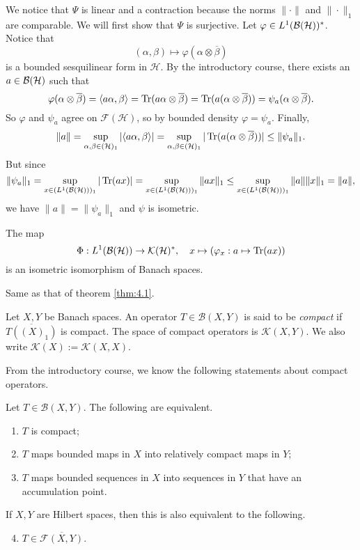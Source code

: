 \begin{myproof}
  We notice that $\Psi$ is linear and a contraction because the norms $\|\cdot \|$
  and $\| \cdot \|_1$ are comparable. We will first show that $\Psi$ is surjective.
  Let $\varphi \in L^1 (\operatorname{\mathcal{B} (\mathcal{H})})^*$. Notice that 
  $$(\alpha, \beta) \mapsto \varphi(\alpha \otimes \overline{\beta})$$
  is a bounded sesquilinear form in $\mathcal{H}$. By the introductory course, there exists 
  an $a \in \operatorname{\mathcal{B} (\mathcal{H})}$ such that 
  $$\varphi(\alpha \otimes \overline{\beta}) = \langle a \alpha, \beta \rangle = \operatorname{Tr} (a\alpha \otimes \overline{\beta}) = \operatorname{Tr} (a(\alpha \otimes \overline{\beta})) = \psi_a (\alpha \otimes \overline{\beta}).$$
  So $\varphi$ and $\psi_a$ agree on $\mathcal{F} (\mathcal{H})$, so by bounded density $\varphi = \psi_a$.
  Finally, 
  $$\| a\| = \sup_{\alpha, \beta \in (\mathcal{H})_1} |\langle a \alpha, \beta \rangle| = \sup_{\alpha, \beta \in (\mathcal{H})_1} |\operatorname{Tr} (a (\alpha \otimes \overline{\beta})) | \leq \| \psi_a \|_1.$$
  But since 
  $$\| \psi_a \|_1 = \sup_{x \in (L^1(\operatorname{\mathcal{B} (\mathcal{H})}))_1} |\operatorname{Tr} (ax)| = \sup_{x \in (L^1(\operatorname{\mathcal{B} (\mathcal{H})}))_1} \| ax \|_1 \leq \sup_{x \in (L^1(\operatorname{\mathcal{B} (\mathcal{H})}))_1} \| a \| \|x \|_1 = \| a\|,$$
  we have $\| a\| = \| \psi_a\|_1$ and $\psi$ is isometric.
\end{myproof}

\begin{corollary}
  The map $$\Phi: L^1 (\operatorname{\mathcal{B} (\mathcal{H})}) \to \mathcal{K} (\mathcal{H})^*, \quad x \mapsto (\varphi_x: a \mapsto \operatorname{Tr} (ax))$$
  is an isometric isomorphism of Banach spaces.
\end{corollary}

\begin{myproof}
  Same as that of theorem \ref{thm:4.1}.
\end{myproof}

\begin{definition}
  Let $X, Y$ be Banach spaces. An operator $T\in \mathcal{B}(X, Y)$ is said to be \emph{compact}
  if $\overline{T((X)_1)}$ is compact. The space of compact operators is $\mathcal{K} (X, Y)$.
  We also write $\mathcal{K} (X) := \mathcal{K} (X, X)$.
\end{definition}

From the introductory course, we know the following statements about compact operators.

\begin{proposition}
  Let $T \in \mathcal{B}(X, Y)$. The following are equivalent.
  \begin{enumerate}
    \item $T$ is compact;
    \item $T$ maps bounded maps in $X$ into relatively compact maps in $Y$;
    \item $T$ maps bounded sequences in $X$ into sequences in $Y$ that have an accumulation point.
  \end{enumerate}
  If $X, Y$ are Hilbert spaces, then this is also equivalent to the following.
  \begin{enumerate}\setcounter{enumi}{3}
    \item $T \in \overline{\mathcal{F}(X, Y)}$.
  \end{enumerate}
\end{proposition}

